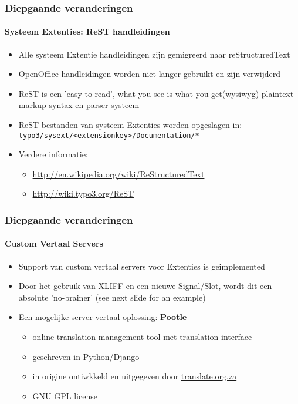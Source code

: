 \begin{frame}[fragile]
	\frametitle{Diepgaande veranderingen}
	\framesubtitle{Systeem Extenties: ReST handleidingen}

	\begin{itemize}
		\item Alle systeem Extentie handleidingen zijn gemigreerd naar reStructuredText
		\item OpenOffice handleidingen worden niet langer gebruikt en zijn verwijderd
		\item ReST is een 'easy-to-read', what-you-see-is-what-you-get(wysiwyg) plaintext markup syntax en parser systeem
		\item ReST bestanden van systeem Extenties worden opgeslagen in:\newline
			\texttt{typo3/sysext/<extensionkey>/Documentation/*}

		\item Verdere informatie:

			\begin{itemize}
				\item \url{http://en.wikipedia.org/wiki/ReStructuredText}
				\item \url{http://wiki.typo3.org/ReST}
			\end{itemize}

	\end{itemize}

\end{frame}


\begin{frame}[fragile]
	\frametitle{Diepgaande veranderingen}
	\framesubtitle{Custom Vertaal Servers}

	\begin{itemize}
		\item Support van custom vertaal servers voor Extenties is geimplemented
		\item Door het gebruik van XLIFF en een nieuwe Signal/Slot,\newline
			wordt dit een absolute 'no-brainer' (see next slide for an example)
		\item Een mogelijke server vertaal oplossing: \textbf{Pootle}

			\begin{itemize}
				\item online translation management tool met translation interface
				\item geschreven in Python/Django
				\item in origine ontiwkkeld en uitgegeven door \url{translate.org.za}
				\item GNU GPL license
			\end{itemize}

	\end{itemize}

\end{frame}

